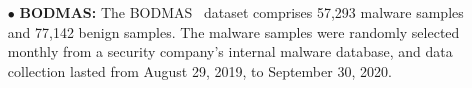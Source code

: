 \begin{itemize}[leftmargin=*]
	
	\item[$\bullet$] \textbf{BODMAS:}
	The BODMAS~\cite{2021-PE-malware-dataset} dataset comprises 57,293 malware samples and 77,142 benign samples.
	The malware samples were randomly selected monthly from a security company's internal malware database, and data collection lasted from August 29, 2019, to September 30, 2020.
	

\end{itemize}
